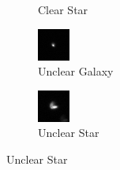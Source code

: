 \documentclass[a4paper,fleqn,usenatbib]{mnras}
\begin{document}
\begin{figure}
\begin{subfigure}{0.5\columnwidth}
 \caption{Clear Star}
 \label{fig:Star1}
 \end{subfigure}
 \begin{subfigure}{0.5\columnwidth}
 \includegraphics[width=\columnwidth]{../Figures/GalaxyExample2}
 \caption{Unclear Galaxy}
 \label{fig:Galaxy2}
 \end{subfigure}
  \begin{subfigure}{0.5\columnwidth}
 \includegraphics[width=\columnwidth]{../Figures/StarExample2}
 \caption{Unclear Star}
 \label{fig:Star2}
 \end{subfigure}


\end{figure}
\end{document}
